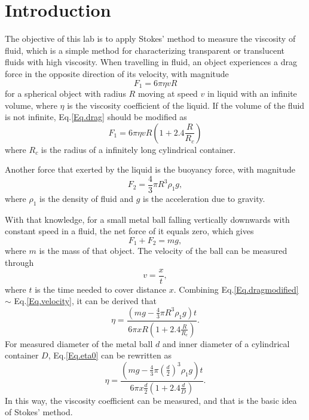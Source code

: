 \documentclass[a4paper]{article}
\begin{document}
		\section{Introduction\label{intro}}
The objective of this lab is to apply Stokes' method to measure the viscosity of fluid, which is a simple method for characterizing transparent or translucent fluids with high viscosity.
When travelling in fluid, an object experiences a drag force in the opposite direction of its velocity, with magnitude
\begin{equation}\label{Eq.drag}
F_1=6\pi\eta vR
\end{equation}
for a spherical object with radius $R$ moving at speed $v$ in liquid with an infinite volume, where $\eta$ is the viscosity coefficient of the liquid. If the volume of the fluid is not infinite, Eq.\eqref{Eq.drag} should be modified as
\begin{equation}\label{Eq.dragmodified}
F_1=6\pi\eta vR(1+2.4\frac{R}{R_c})
\end{equation}
where $R_c$ is the radius of a infinitely long cylindrical container.

Another force that exerted by the liquid is the buoyancy force, with magnitude
\begin{equation}\label{Eq.buoyancy}
F_2=\frac{4}{3}\pi R^3 \rho_1 g,
\end{equation}
where $\rho_1$ is the density of fluid and $g$ is the acceleration due to gravity.

With that knowledge, for a small metal ball falling vertically downwards with constant speed in a fluid, the net force of it equals zero, which gives
\begin{equation}\label{Eq.balance}
F_1+F_2 = mg,
\end{equation}
where $m$ is the mass of that object.
The velocity of the ball can be measured through
\begin{equation}\label{Eq.velocity}
v = \frac{x}{t},
\end{equation}
where $t$ is the time needed to cover distance $x$.
Combining Eq.\eqref{Eq.dragmodified} $\sim$ Eq.\eqref{Eq.velocity}, it can be derived that
\begin{equation}\label{Eq.eta0}
\eta=\frac{(mg-\frac{4}{3}\pi R^3\rho_1g)t}{6\pi xR(1+2.4\frac{R}{R_c})}.
\end{equation}
For measured diameter of the metal ball $d$ and inner diameter of a cylindrical container $D$, Eq.\eqref{Eq.eta0} can be rewritten as
\begin{equation}\label{Eq.eta}
\eta=\frac{(mg-\frac{4}{3}\pi (\frac{d}{2})^3\rho_1g)t}{6\pi x \frac{d}{2}(1+2.4\frac{d}{D})}.
\end{equation}
In this way, the viscosity coefficient can be measured, and that is the basic idea of Stokes' method.
\end{document}
